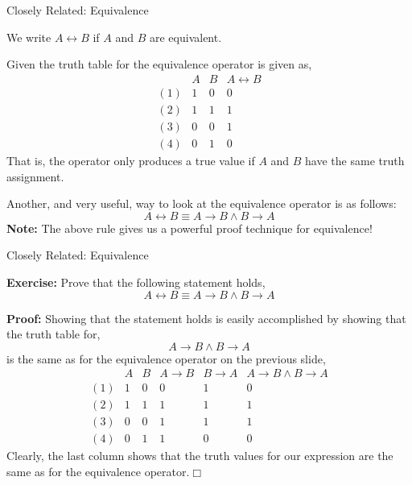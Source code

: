 \documentclass{beamer}
\begin{document}
\begin{frame}{Closely Related: Equivalence}

We write $A \leftrightarrow B$ if $A$ and $B$ are equivalent.

Given the truth table for the equivalence operator is given as,
\[
\begin{array}{lcc|c}
&A & B & A \leftrightarrow B\\ \hline
(1)& 1 & 0 & 0\\
(2) & 1 & 1 & 1\\
(3) & 0 & 0 & 1\\
(4) & 0 & 1 & 0
\end{array}
\]
That is, the operator only produces a true value if $A$ and $B$ have the same truth assignment.

Another, and very useful, way to look at the equivalence operator is as follows:
\[
A \leftrightarrow B \equiv A \rightarrow B \wedge B \rightarrow A
\]
{\bf Note:} The above rule gives us a powerful proof technique for equivalence!
\end{frame}

\begin{frame}{Closely Related: Equivalence}

{\small
{\bf Exercise:} Prove that the following statement holds,
\[
A \leftrightarrow B \equiv A \rightarrow B \wedge B \rightarrow A
\]

{\bf Proof:} Showing that the statement holds is easily accomplished by showing that the truth table
for,
\[
A \rightarrow B \wedge B \rightarrow A
\]
is the same as for the equivalence operator on the previous slide,
\[
\begin{array}{lcccc|c}
&A & B & A \rightarrow B& B \rightarrow A& A \rightarrow B \wedge B \rightarrow A\\ \hline
(1)& 1 & 0 & 0 & 1 & 0\\
(2) & 1 & 1 & 1&1&1\\
(3) & 0 & 0 & 1&1&1\\
(4) & 0 & 1 & 1&0&0
\end{array}
\]
Clearly, the last column shows that the truth values for our expression are the same as for the equivalence operator.$\Box$
}

\end{frame}
\end{document}
